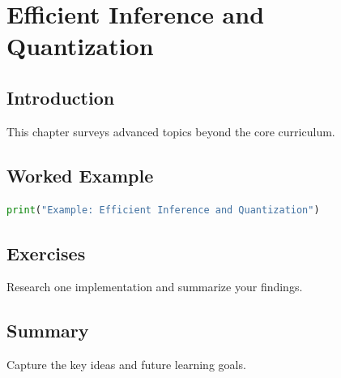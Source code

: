 \chapter{Efficient Inference and Quantization}
\label{chap:vol13-3}



\section{Introduction}
This chapter surveys advanced topics beyond the core curriculum.

\section{Worked Example}
\begin{lstlisting}[language=Python]
print("Example: Efficient Inference and Quantization")
\end{lstlisting}

\section{Exercises}
\begin{exercise}
Research one implementation and summarize your findings.
\end{exercise}

\section{Summary}
Capture the key ideas and future learning goals.
